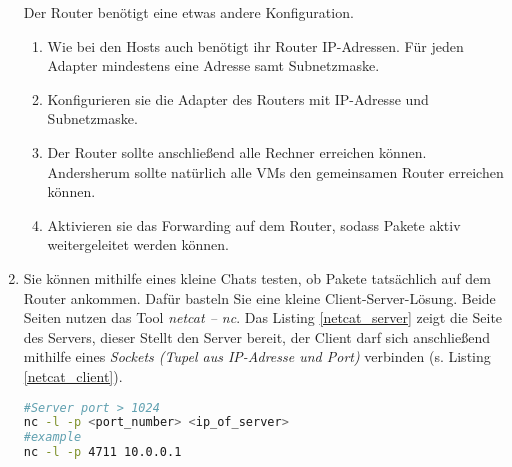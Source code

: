 \documentclass[paper=a4,fontsize=11pt]{scrartcl}%
\begin{document}
\begin{enumerate}
	Der Router benötigt eine etwas andere Konfiguration. 
	\begin{enumerate}
		\item Wie bei den Hosts auch benötigt ihr Router IP-Adressen. Für jeden Adapter mindestens eine Adresse samt Subnetzmaske. 
		\item Konfigurieren sie die Adapter des Routers mit IP-Adresse und Subnetzmaske.
		\item Der Router sollte anschließend alle Rechner erreichen können. Andersherum sollte natürlich alle VMs den gemeinsamen Router erreichen können.
		\item Aktivieren sie das Forwarding auf dem Router, sodass Pakete aktiv weitergeleitet werden können.
		\end{enumerate}
		\item Sie können mithilfe eines kleine Chats testen, ob Pakete tatsächlich auf dem Router ankommen. Dafür basteln Sie eine kleine  Client-Server-Lösung. Beide Seiten nutzen das Tool \emph{netcat -- nc}. Das Listing \ref{netcat_server} zeigt die Seite des Servers, dieser Stellt den Server bereit, der Client darf sich anschließend mithilfe eines \emph{Sockets (Tupel aus IP-Adresse und Port)} verbinden (s. Listing \ref{netcat_client}). 
		\begin{lstlisting}[style=Bash, language=Bash, label={netcat_server}]
#Server port > 1024 
nc -l -p <port_number> <ip_of_server>
#example
nc -l -p 4711 10.0.0.1
		\end{lstlisting}
		

\end{enumerate}
\end{document}
